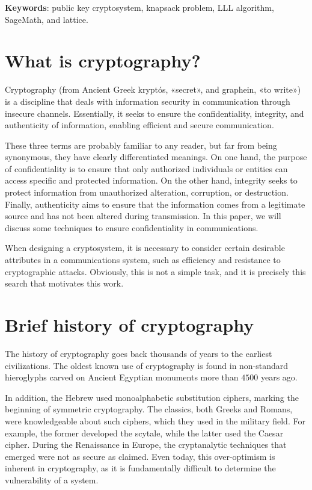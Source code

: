 %


\textbf{Keywords}: public key cryptosystem, knapsack problem, LLL algorithm, SageMath, and lattice.

\section*{What is cryptography?}

Cryptography (from Ancient Greek kryptós, «secret», and graphein, «to write») is a discipline that deals with information security in communication through insecure channels. Essentially, it seeks to ensure the confidentiality, integrity, and authenticity of information, enabling efficient and secure communication.

These three terms are probably familiar to any reader, but far from being synonymous, they have clearly differentiated meanings. On one hand, the purpose of confidentiality is to ensure that only authorized individuals or entities can access specific and protected information. On the other hand, integrity seeks to protect information from unauthorized alteration, corruption, or destruction. Finally, authenticity aims to ensure that the information comes from a legitimate source and has not been altered during transmission. In this paper, we will discuss some techniques to ensure confidentiality in communications.

When designing a cryptosystem, it is necessary to consider certain desirable attributes in a communications system, such as efficiency and resistance to cryptographic attacks. Obviously, this is not a simple task, and it is precisely this search that motivates this work.

\section*{Brief history of cryptography}

The history of cryptography goes back thousands of years to the earliest civilizations. The oldest known use of cryptography is found in non-standard hieroglyphs carved on Ancient Egyptian monuments more than $4500$ years ago.

In addition, the Hebrew used monoalphabetic substitution ciphers, marking the beginning of symmetric cryptography. The classics, both Greeks and Romans, were knowledgeable about such ciphers, which they used in the military field. For example, the former developed the scytale, while the latter used the Caesar cipher. During the Renaissance in Europe, the cryptanalytic techniques that emerged were not as secure as claimed. Even today, this over-optimism is inherent in cryptography, as it is fundamentally difficult to determine the vulnerability of a system.

